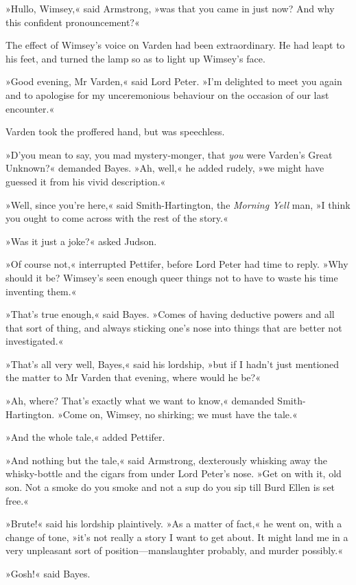 »Hullo, Wimsey,« said Armstrong, »was that you came in just now? And why this confident pronouncement?«

The effect of Wimsey's voice on Varden had been extraordinary. He had leapt to his feet, and turned the lamp so as to light up Wimsey's face.

»Good evening, Mr Varden,« said Lord Peter. »I'm delighted to meet you again and to apologise for my unceremonious behaviour on the occasion of our last encounter.«

Varden took the proffered hand, but was speechless.

»D'you mean to say, you mad mystery-monger, that \textit{you} were Varden's Great Unknown?« demanded Bayes. »Ah, well,« he added rudely, »we might have guessed it from his vivid description.«

»Well, since you're here,« said Smith-Hartington, the \textit{Morning Yell} man, »I think you ought to come across with the rest of the story.«

»Was it just a joke?« asked Judson.

»Of course not,« interrupted Pettifer, before Lord Peter had time to reply. »Why should it be? Wimsey's seen enough queer things not to have to waste his time inventing them.«

»That's true enough,« said Bayes. »Comes of having deductive powers and all that sort of thing, and always sticking one's nose into things that are better not investigated.«

»That's all very well, Bayes,« said his lordship, »but if I hadn't just mentioned the matter to Mr Varden that evening, where would he be?«

»Ah, where? That's exactly what we want to know,« demanded Smith-Hartington. »Come on, Wimsey, no shirking; we must have the tale.«

»And the whole tale,« added Pettifer.

»And nothing but the tale,« said Armstrong, dexterously whisking away the whisky-bottle and the cigars from under Lord Peter's nose. »Get on with it, old son. Not a smoke do you smoke and not a sup do you sip till Burd Ellen is set free.«

»Brute!« said his lordship plaintively. »As a matter of fact,« he went on, with a change of tone, »it's not really a story I want to get about. It might land me in a very unpleasant sort of position—manslaughter probably, and murder possibly.«

»Gosh!« said Bayes.


